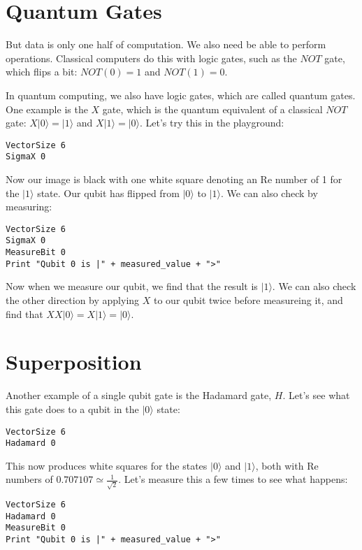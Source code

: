 \documentclass[twocolumn]{article}
\begin{document}
\section{Quantum Gates}

But data is only one half of computation. We also need be able to perform operations. Classical computers do this with logic gates, such as the $NOT$ gate, which flips a bit: $NOT(0) = 1$ and $NOT(1) = 0$.

In quantum computing, we also have logic gates, which are called quantum gates. One example is the $X$ gate, which is the quantum equivalent of a classical $NOT$ gate: $X|0\rangle = |1\rangle$ and $X|1\rangle = |0\rangle$. Let's try this in the playground:

\begin{lstlisting}
VectorSize 6
SigmaX 0
\end{lstlisting}

Now our image is black with one white square denoting an Re number of 1 for the $|1\rangle$ state. Our qubit has flipped from $|0\rangle$ to $|1\rangle$. We can also check by measuring:

\begin{lstlisting}
VectorSize 6
SigmaX 0
MeasureBit 0
Print "Qubit 0 is |" + measured_value + ">"
\end{lstlisting}

Now when we measure our qubit, we find that the result is $|1\rangle$. We can also check the other direction by applying $X$ to our qubit twice before measureing it, and find that $XX|0\rangle = X|1\rangle = |0\rangle$.

\section{Superposition}
\label{sec:superposition}

Another example of a single qubit gate is the Hadamard gate, $H$. Let's see what this gate does to a qubit in the $|0\rangle$ state:

\begin{lstlisting}
VectorSize 6
Hadamard 0
\end{lstlisting}

This now produces white squares for the states $|0\rangle$ and $|1\rangle$, both with Re numbers of $0.707107 \simeq \frac{1}{\sqrt{2}}$. Let's measure this a few times to see what happens:

\begin{lstlisting}
VectorSize 6
Hadamard 0
MeasureBit 0
Print "Qubit 0 is |" + measured_value + ">"
\end{lstlisting}
\end{document}
